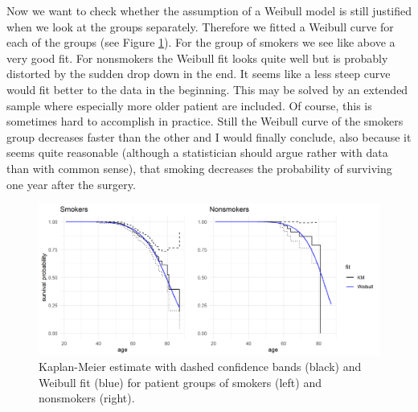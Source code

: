 Now we want to check whether the assumption of a Weibull model is still justified when we look at the groups separately. Therefore we fitted a Weibull curve for each of the groups (see Figure \ref{5paragroups}). For the group of smokers we see like above a very good fit. For nonsmokers the Weibull fit looks quite well but is probably distorted by the sudden drop down in the end. It seems like a less steep curve would fit better to the data in the beginning. This may be solved by an extended sample where especially more older patient are included. Of course, this is sometimes hard to accomplish in practice. Still the Weibull curve of the smokers group decreases faster than the other and I would finally conclude, also because it seems quite reasonable (although a statistician should argue rather with data than with common sense), that smoking decreases the probability of surviving one year after the surgery. 
\begin{figure}[!h]
\centering
\includegraphics[width=\textwidth, keepaspectratio]{ex4/groupsparam}
\caption{Kaplan-Meier estimate with dashed confidence bands (black) and Weibull fit (blue) for patient groups of smokers (left) and nonsmokers (right).}
\label{5paragroups}
\end{figure}